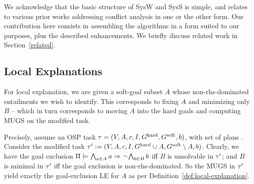 %

We acknowledge that the basic structure of SysW and SysS is simple,
and relates to various prior works addressing conflict analysis in one
or the other form. Our contribution here consists in assembling the
algorithms in a form suited to our purposes, plus the described
enhancements. We briefly discuss related work in
Section~\ref{related}.






\subsection{Local Explanations}
\label{algorithms:le}

For local explanation, we are given a soft-goal subset $A$ whose
non-rhs-dominated entailments we wish to identify. This corresponds to
fixing $A$ and minimizing only $B$ -- which in turn corresponds to
moving $A$ into the hard goals and computing MUGS on the modified
task.

Precisely, assume an OSP task $\tau =
(V,\allowbreak A,\allowbreak{\ensuremath{c}},\allowbreak I,\allowbreak G^{\text{\textup{hard}}},\allowbreak G^{\text{\textup{soft}}},\allowbreak{\ensuremath{b}})$,
with set of plans \plans. Consider the modified task $\tau' :=
(V,\allowbreak A,\allowbreak{\ensuremath{c}},\allowbreak I,\allowbreak G^{\text{\textup{hard}}}
\cup A,\allowbreak G^{\text{\textup{soft}}} \setminus
A,\allowbreak{\ensuremath{b}})$. Clearly, we have the goal exclusion
$\Pi \models \bigwedge_{a \in A} a \Rightarrow \neg \bigwedge_{b \in B} b$
iff $B$ is unsolvable in $\tau'$; and $B$ is minimal in $\tau'$ iff
the goal exclusion is non-rhs-dominated. So the MUGS in $\tau'$ yield
exactly the goal-exclusion LE for $A$ as per
Definition~\ref{def:local-explanation}.

